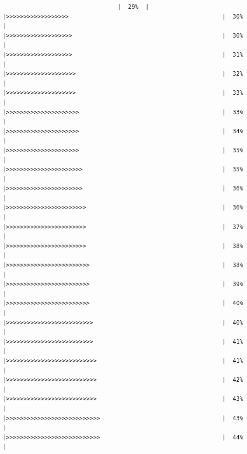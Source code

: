 \documentclass[
]{book}
\begin{document}
\begin{verbatim}
                                 |  29%  |                                                                      |>>>>>>>>>>>>>>>>>>                                            |  30%  |                                                                      |>>>>>>>>>>>>>>>>>>>                                           |  30%  |                                                                      |>>>>>>>>>>>>>>>>>>>                                           |  31%  |                                                                      |>>>>>>>>>>>>>>>>>>>>                                          |  32%  |                                                                      |>>>>>>>>>>>>>>>>>>>>                                          |  33%  |                                                                      |>>>>>>>>>>>>>>>>>>>>>                                         |  33%  |                                                                      |>>>>>>>>>>>>>>>>>>>>>                                         |  34%  |                                                                      |>>>>>>>>>>>>>>>>>>>>>                                         |  35%  |                                                                      |>>>>>>>>>>>>>>>>>>>>>>                                        |  35%  |                                                                      |>>>>>>>>>>>>>>>>>>>>>>                                        |  36%  |                                                                      |>>>>>>>>>>>>>>>>>>>>>>>                                       |  36%  |                                                                      |>>>>>>>>>>>>>>>>>>>>>>>                                       |  37%  |                                                                      |>>>>>>>>>>>>>>>>>>>>>>>                                       |  38%  |                                                                      |>>>>>>>>>>>>>>>>>>>>>>>>                                      |  38%  |                                                                      |>>>>>>>>>>>>>>>>>>>>>>>>                                      |  39%  |                                                                      |>>>>>>>>>>>>>>>>>>>>>>>>                                      |  40%  |                                                                      |>>>>>>>>>>>>>>>>>>>>>>>>>                                     |  40%  |                                                                      |>>>>>>>>>>>>>>>>>>>>>>>>>                                     |  41%  |                                                                      |>>>>>>>>>>>>>>>>>>>>>>>>>>                                    |  41%  |                                                                      |>>>>>>>>>>>>>>>>>>>>>>>>>>                                    |  42%  |                                                                      |>>>>>>>>>>>>>>>>>>>>>>>>>>                                    |  43%  |                                                                      |>>>>>>>>>>>>>>>>>>>>>>>>>>>                                   |  43%  |                                                                      |>>>>>>>>>>>>>>>>>>>>>>>>>>>                                   |  44%  |           
\end{verbatim}
\end{document}
